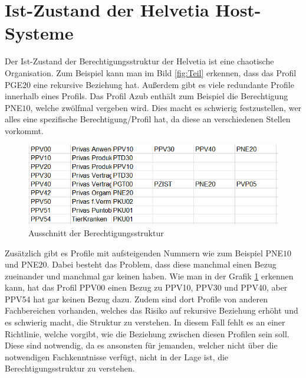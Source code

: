 \section{Ist-Zustand der Helvetia Host-Systeme}
\label{sec:chapter03:Ist-Zustand}
Der Ist-Zustand der Berechtigungsstruktur der Helvetia ist eine chaotische Organisation.
Zum Beispiel kann man im Bild \ref{fig:Teil} erkennen, dass das Profil PGE$20$ eine rekursive Beziehung hat.
Außerdem gibt es viele redundante Profile innerhalb eines Profils.
Das Profil Azub enthält zum Beispiel die Berechtigung PNE$10$, welche zwölfmal vergeben wird.
Dies macht es schwierig festzustellen, wer alles eine spezifische Berechtigung/Profil hat, da diese an verschiedenen Stellen vorkommt.
\begin{figure}[h!]
 \centering
 \includegraphics[width=1\textwidth]{gfx/Picture/Beispiel.PNG}
 \caption{Ausschnitt der Berechtigungsstruktur}
 \label{fig:Profile}
\end{figure}
Zusätzlich gibt es Profile mit aufsteigenden Nummern wie zum Beispiel PNE$10$ und PNE$20$.
Dabei besteht das Problem, dass diese manchmal einen Bezug zueinander und manchmal gar keinen haben.
Wie man in der Grafik \ref{fig:Profile} erkennen kann, hat das Profil PPV00 einen Bezug zu PPV10, PPV30 und PPV40, aber PPV54 hat gar keinen Bezug dazu.
Zudem sind dort Profile von anderen Fachbereichen vorhanden, welches das Risiko auf rekursive Beziehung erhöht und es schwierig macht, die Struktur zu verstehen.
In diesem Fall fehlt es an einer Richtlinie, welche vorgibt, wie die Beziehung zwischen diesen Profilen sein soll.
Diese sind notwendig, da es ansonsten für jemanden, welcher nicht über die notwendigen Fachkenntnisse verfügt, nicht in der Lage ist, die Berechtigungsstruktur zu verstehen.
